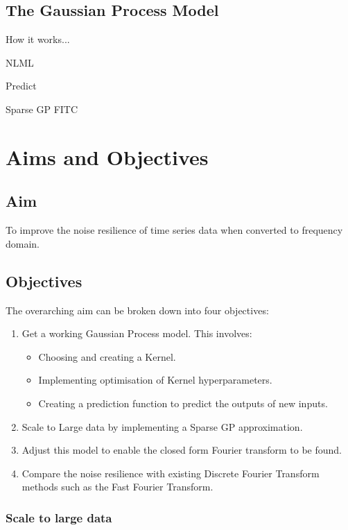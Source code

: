 \documentclass[12pt]{article}
\begin{document}
    \subsection{The Gaussian Process Model}
    How it works...

    NLML

    Predict

    Sparse GP
        FITC


    \section{Aims and Objectives}
    \subsection{Aim}
    To improve the noise resilience of time series data when converted to frequency domain.

    \subsection{Objectives}
    The overarching aim can be broken down into four objectives:
        \begin{enumerate}
            \item Get a working Gaussian Process model.
            This involves:
                \begin{itemize}
                    \item Choosing and creating a Kernel.
                    \item Implementing optimisation of Kernel hyperparameters. \label{item:nll}
                    \item Creating a prediction function to predict the outputs of new inputs. \label{item:predict}
                \end{itemize}
            \item Scale to Large data by implementing a Sparse GP approximation.
            \item Adjust this model to enable the closed form Fourier transform to be found.
            \item Compare the noise resilience with existing Discrete Fourier Transform methods such as the Fast Fourier Transform.
        \end{enumerate}

    \subsubsection{Scale to large data}
\end{document}
